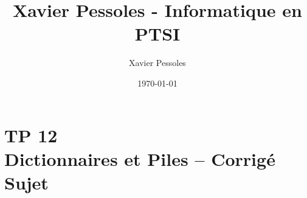 \documentclass[
	fontsize=10pt, %
	twoside=true, %
]{kaobook}
\newcommand{\repRel}{../../../..}
\newcommand{\repStyle}{\repRel/Style}
\begin{document}

\titlehead{Xavier Pessoles - Informatique en PTSI}
\title[Xavier Pessoles - Informatique en PTSI]{Xavier Pessoles - Informatique en PTSI}
\author[XP]{Xavier Pessoles}
\date{\today}


\begingroup %
\endgroup

%
\mainmatter %
%
%
%
%


\setcounter{margintocdepth}{\sectiontocdepth}
\marginlayout
\graphicspath{{\repStyle/png}}

\pagestyle{xp.scrheadings}


%



\newcommand{\repExo}{}
\newcommand{\nomExo}{}

\livrettrue %
\livrettrue
\colletrue








\chapter*{TP 12 \\ 
Dictionnaires et Piles -- \ifprof Corrigé \else Sujet \fi}
\end{document}
